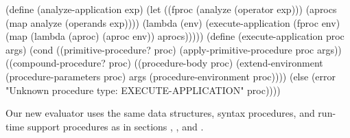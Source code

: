 \begin{codeBlock}
(define (analyze-application exp)
  (let ((fproc (analyze (operator exp)))
        (aprocs (map analyze (operands exp))))
    (lambda (env)
      (execute-application
       (fproc env)
       (map (lambda (aproc) (aproc env))
            aprocs)))))
(define (execute-application proc args)
  (cond ((primitive-procedure? proc)
         (apply-primitive-procedure proc args))
        ((compound-procedure? proc)
         ((procedure-body proc)
          (extend-environment
           (procedure-parameters proc)
           args
           (procedure-environment proc))))
        (else
         (error "Unknown procedure type: EXECUTE-APPLICATION"
                proc))))
\end{codeBlock}

\noindent
Our new evaluator uses the same data structures, syntax procedures, and
run-time support procedures as in sections , , and
.

